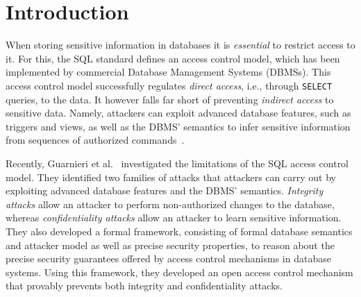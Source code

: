 \section{Introduction}
When storing sensitive information in databases it is \emph{essential} to restrict access to it. 
%
For this, the SQL standard defines an access control model, which has been implemented by commercial Database Management Systems (DBMSs). 
%
This access control model successfully regulates \emph{direct access}, i.e., through \texttt{SELECT} queries, to the data. It however falls far short of preventing \emph{indirect access} to sensitive data.
%
Namely, attackers can exploit advanced database features, such as triggers and views, as well as the DBMS' semantics to infer sensitive information from sequences of authorized commands~\cite{guarnieri2016strong, ..., ..., ...}.
%
%



Recently, Guarnieri et al.~\cite{guarnieri2016strong} investigated the limitations of the SQL access control model. 
%
They identified two families of attacks that attackers can carry out by exploiting advanced database features and the DBMS' semantics.
%
%
\emph{Integrity attacks} allow an attacker to perform non-authorized changes to the database, whereas \emph{confidentiality attacks} allow an attacker to learn sensitive information.
%
They also developed a formal framework, consisting of formal database semantics and attacker model as well as precise security properties, to reason about the precise security guarantees offered by access control mechanisms in database systems.
%
Using this framework, they developed an open  access control mechanism that provably prevents both integrity and confidentiality attacks.


